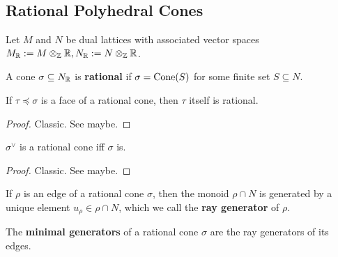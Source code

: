 \subsection{Rational Polyhedral Cones}


Let $M$ and $N$ be dual lattices with associated vector spaces $M_{\mathbb R} := M \otimes_{\mathbb Z} {\mathbb R}, N_{\mathbb R} := N \otimes_{\mathbb Z} {\mathbb R}$.


\begin{definition}
  \label{1-2-14-rat-cone}

  A cone $\sigma \subseteq N_{\mathbb R}$ is {\bf rational} if $\sigma = \operatorname{Cone}(S)$ for some finite set $S \subseteq N$.
\end{definition}


\begin{lemma}
  \label{1-2-14-face-rat-cone}
  \uses{}

  If $\tau \preceq \sigma$ is a face of a rational cone, then $\tau$ itself is rational.
\end{lemma}
\begin{proof}
  \uses{}

  Classic. See \cite{Oda_1988} maybe.
\end{proof}


\begin{lemma}
  \label{1-2-14-dual-rat-cone}
  \uses{}

  $\sigma^\vee$ is a rational cone iff $\sigma$ is.
\end{lemma}
\begin{proof}
  \uses{}

  Classic. See \cite{Oda_1988} maybe.
\end{proof}


\begin{definition}
  \label{1-2-ray-gen}

  If $\rho$ is an edge of a rational cone $\sigma$, then the monoid $\rho \cap N$ is generated by a unique element $u_\rho \in \rho \cap N$, which we call the {\bf ray generator} of $\rho$.
\end{definition}


\begin{definition}
  \label{1-2-min-gen}

  The {\bf minimal generators} of a rational cone $\sigma$ are the ray generators of its edges.
\end{definition}



